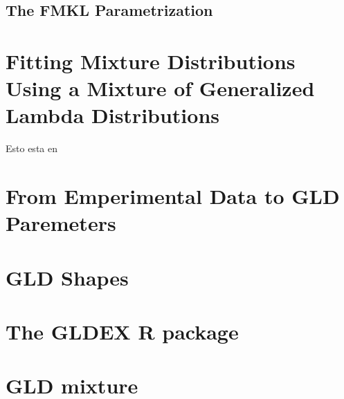 \subsection{The FMKL Parametrization}

\section{Fitting Mixture Distributions Using a Mixture of Generalized Lambda Distributions}
Esto esta en \cite{Tobergte2013}

\section{From Emperimental Data to GLD Paremeters}
\cite{Lampasi2006}

\section{GLD Shapes}

\section{The GLDEX R package}

\section{GLD mixture}
